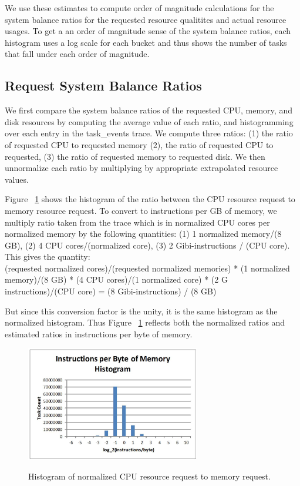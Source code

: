 \documentclass{sig-alternate}
\begin{document}
We use these estimates to compute order of magnitude calculations for the system balance ratios for the requested resource qualitites and actual resource usages.
To get a an order of magnitude sense of the system balance ratios, each histogram uses a log scale for each bucket and thus shows the number of tasks that fall under each order of magnitude.

\subsection{Request System Balance Ratios}

We first compare the system balance ratios of the requested CPU, memory, and disk resources by computing the average value of each ratio, and histogramming over each entry in the task\_events trace.
We compute three ratios: (1) the ratio of requested CPU to requested memory (2), the ratio of requested CPU to requested, (3) the ratio of requested memory to requested disk.
We then unnormalize each ratio by multiplying by appropriate extrapolated resource values.

Figure ~\ref{req_cpu_mem} shows the histogram of the ratio between the CPU resource request to memory resource request. 
To convert to instructions per GB of memory, we multiply ratio taken from the trace which is in normalized CPU cores per normalized memory by the following quantities: (1) 1 normalized memory/(8 GB), (2) 4 CPU cores/(normalized core), (3) 2 Gibi-instructions / (CPU core).  %
This gives the quantity: \\
(requested normalized cores)/(requested normalized memories) * (1 normalized memory)/(8 GB) * (4 CPU cores)/(1 normalized core) * (2 G instructions)/(CPU core) = (8 Gibi-instructions) / (8 GB)

But since this conversion factor is the unity, it is the same histogram as the normalized histogram.
Thus Figure ~\ref{req_cpu_mem} reflects both the normalized ratios and estimated ratios in instructions per byte of memory.

\begin{figure}[t]
\centering
\includegraphics[width=3in]{../figures/req_cpu_mem.jpg}
\label{req_cpu_mem}
\caption{Histogram of normalized CPU resource request to memory request.}
\end{figure}
\end{document}
